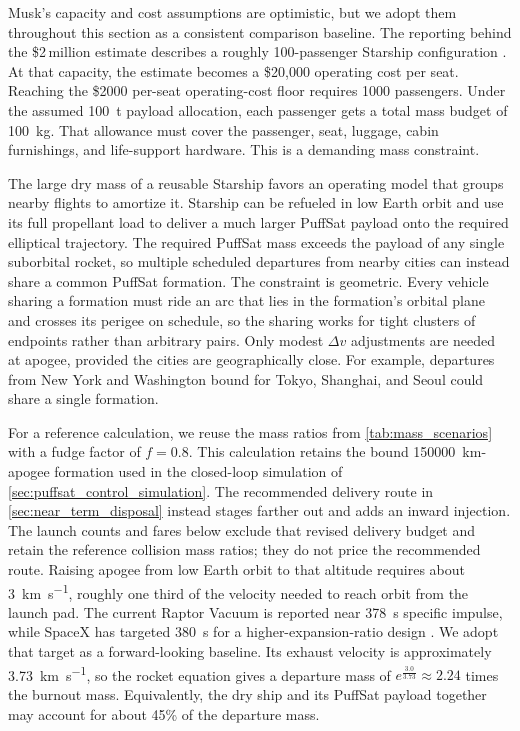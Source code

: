 \documentclass{article}
\newcommand{\deltav}{\Delta v}
\begin{document}
Musk's capacity and cost assumptions are optimistic, but we adopt them throughout this section as a consistent comparison baseline. The reporting behind the \$2\,million estimate describes a roughly 100-passenger Starship configuration \cite{spacex_starship_cost}. At that capacity, the estimate becomes a \$20{,}000 operating cost per seat. Reaching the \$2000 per-seat operating-cost floor requires 1000 passengers. Under the assumed \SI{100}{\tonne} payload allocation, each passenger gets a total mass budget of \SI{100}{\kilo\gram}. That allowance must cover the passenger, seat, luggage, cabin furnishings, and life-support hardware. This is a demanding mass constraint.

The large dry mass of a reusable Starship favors an operating model that groups nearby flights to amortize it. Starship can be refueled in low Earth orbit and use its full propellant load to deliver a much larger PuffSat payload onto the required elliptical trajectory. The required PuffSat mass exceeds the payload of any single suborbital rocket, so multiple scheduled departures from nearby cities can instead share a common PuffSat formation. The constraint is geometric. Every vehicle sharing a formation must ride an arc that lies in the formation's orbital plane and crosses its perigee on schedule, so the sharing works for tight clusters of endpoints rather than arbitrary pairs. Only modest $\deltav$ adjustments are needed at apogee, provided the cities are geographically close. For example, departures from New York and Washington bound for Tokyo, Shanghai, and Seoul could share a single formation.

For a reference calculation, we reuse the mass ratios from \autoref{tab:mass_scenarios} with a fudge factor of $f = 0.8$. This calculation retains the bound \SI{150000}{\kilo\meter}-apogee formation used in the closed-loop simulation of \autoref{sec:puffsat_control_simulation}. The recommended delivery route in \autoref{sec:near_term_disposal} instead stages farther out and adds an inward injection. The launch counts and fares below exclude that revised delivery budget and retain the reference collision mass ratios; they do not price the recommended route. Raising apogee from low Earth orbit to that altitude requires about \SI{3}{\kilo\meter\per\second}, roughly one third of the velocity needed to reach orbit from the launch pad. The current Raptor Vacuum is reported near \SI{378}{\second} specific impulse, while SpaceX has targeted \SI{380}{\second} for a higher-expansion-ratio design \cite{raptor_vacuum_isp}. We adopt that target as a forward-looking baseline. Its exhaust velocity is approximately \SI{3.73}{\kilo\meter\per\second}, so the rocket equation gives a departure mass of $e^{\frac{3.0}{3.73}} \approx 2.24$ times the burnout mass. Equivalently, the dry ship and its PuffSat payload together may account for about 45\% of the departure mass.
\end{document}
